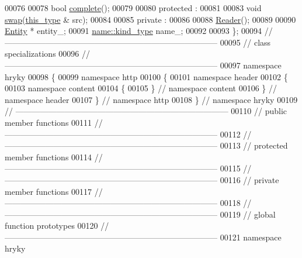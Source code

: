 \begin{DoxyCode}
00076 
00078     \textcolor{keywordtype}{bool} \hyperlink{classhryky_1_1http_1_1header_1_1content_1_1_reader_ae5ea5f5a574fe5ab776363b43704062b}{complete}();
00079 
00080 \textcolor{keyword}{protected} :
00081 
00083     \textcolor{keywordtype}{void} \hyperlink{classhryky_1_1http_1_1header_1_1content_1_1_reader_afdf841948c19644e0879cdf2e1bf2854}{swap}(\hyperlink{classhryky_1_1http_1_1header_1_1content_1_1_reader}{this_type} & src);
00084 
00085 \textcolor{keyword}{private} :
00086 
00088     \hyperlink{classhryky_1_1http_1_1header_1_1content_1_1_reader}{Reader}();
00089 
00090     \hyperlink{classhryky_1_1http_1_1header_1_1_entity}{Entity} *        entity\_;
00091     \hyperlink{classhryky_1_1_kind}{name::kind_type} name\_;
00092 
00093 \};
00094 \textcolor{comment}{//
      ------------------------------------------------------------------------------}
00095 \textcolor{comment}{// class specializations}
00096 \textcolor{comment}{//
      ------------------------------------------------------------------------------}
00097 \textcolor{keyword}{namespace }hryky
00098 \{
00099 \textcolor{keyword}{namespace }http
00100 \{
00101 \textcolor{keyword}{namespace }header
00102 \{
00103 \textcolor{keyword}{namespace }content
00104 \{
00105 \} \textcolor{comment}{// namespace content}
00106 \} \textcolor{comment}{// namespace header}
00107 \} \textcolor{comment}{// namespace http}
00108 \} \textcolor{comment}{// namespace hryky}
00109 \textcolor{comment}{//
      ------------------------------------------------------------------------------}
00110 \textcolor{comment}{// public member functions}
00111 \textcolor{comment}{//
      ------------------------------------------------------------------------------}
00112 \textcolor{comment}{//
      ------------------------------------------------------------------------------}
00113 \textcolor{comment}{// protected member functions}
00114 \textcolor{comment}{//
      ------------------------------------------------------------------------------}
00115 \textcolor{comment}{//
      ------------------------------------------------------------------------------}
00116 \textcolor{comment}{// private member functions}
00117 \textcolor{comment}{//
      ------------------------------------------------------------------------------}
00118 \textcolor{comment}{//
      ------------------------------------------------------------------------------}
00119 \textcolor{comment}{// global function prototypes}
00120 \textcolor{comment}{//
      ------------------------------------------------------------------------------}
00121 \textcolor{keyword}{namespace }hryky

\end{DoxyCode}
